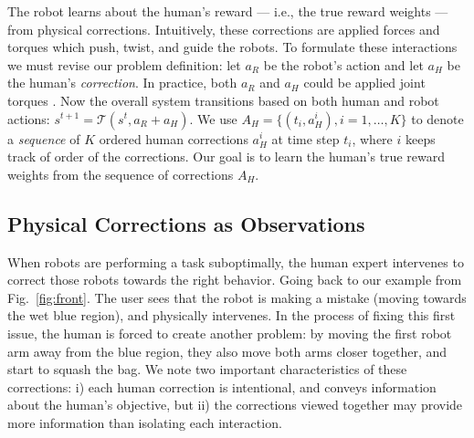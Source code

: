 \smallskip
{} The robot learns about the human's reward --- i.e., the true reward weights --- from physical corrections. Intuitively, these corrections are applied forces and torques which push, twist, and guide the robots. To formulate these interactions we must revise our problem definition: let $a_R$ be the robot's action and let $a_H$ be the human's \textit{correction}. In practice, both $a_R$ and $a_H$ could be applied joint torques \cite{bajcsy2017learning, bajcsy2018learning}. Now the overall system transitions based on both human and robot actions: $s^{t+1} = \mathcal{T}\left(s^t, a_{R}+a_{H}\right)$. We use $A_H = \{(t_i, a_H^i), i=1,\ldots, K\}$ to denote a \textit{sequence} of $K$ ordered human corrections $a_H^i$ at time step $t_i$, where $i$ keeps track of order of the corrections.
Our goal is to learn the human's true reward weights from the sequence of corrections $A_H$.





\subsection{Physical Corrections as Observations}
\label{sec:observation}

When robots are performing a task suboptimally, the human expert intervenes to correct those robots towards the right behavior. Going back to our example from Fig.~\ref{fig:front}. The user sees that the robot is making a mistake (moving towards the wet blue region), and physically intervenes. In the process of fixing this first issue, the human is forced to create another problem: by moving the first robot arm away from the blue region, they also move both arms closer together, and start to squash the bag. We note two important characteristics of these corrections: i) each human correction is intentional, and conveys information about the human's objective, but ii) the corrections viewed together may provide more information than isolating each interaction.

